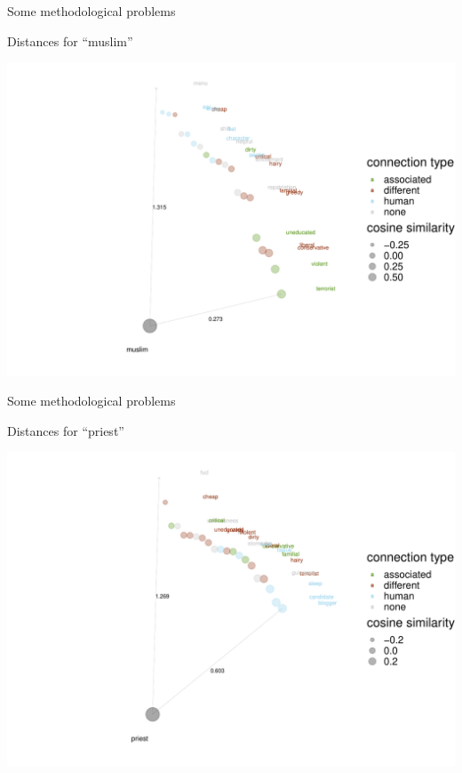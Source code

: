 \documentclass[
  10pt,
  ignorenonframetext,
  x11names, dvipsnames, bibspacing,natbib]{beamer}
\begin{document}
\begin{frame}{Some methodological problems}
\protect\hypertarget{some-methodological-problems-3}{}
\begin{block}{Distances for ``muslim''}
\protect\hypertarget{distances-for-muslim}{}
\begin{center}\includegraphics[width=0.8\linewidth]{presentationBoston_files/figure-beamer/unnamed-chunk-4-1} \end{center}
\end{block}
\end{frame}

\begin{frame}{Some methodological problems}
\protect\hypertarget{some-methodological-problems-4}{}
\begin{block}{Distances for ``priest''}
\protect\hypertarget{distances-for-priest}{}
\begin{center}\includegraphics[width=0.8\linewidth]{presentationBoston_files/figure-beamer/unnamed-chunk-5-1} \end{center}
\end{block}
\end{frame}
\end{document}
